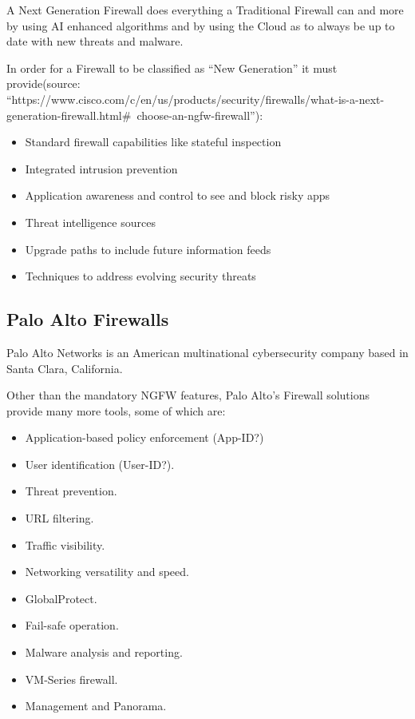 \newpage

A Next Generation Firewall does everything a Traditional Firewall can and more by using AI enhanced algorithms  and by using the Cloud as to always be up to date with new threats and malware.

In order for a Firewall to be classified as ``New Generation'' it must provide(source: ``https://www.cisco.com/c/en/us/products/security/firewalls/what-is-a-next-generation-firewall.html\#~choose-an-ngfw-firewall''):

\begin{itemize}
 \item Standard firewall capabilities like stateful inspection
 \item Integrated intrusion prevention
 \item Application awareness and control to see and block risky apps
 \item Threat intelligence sources
 \item Upgrade paths to include future information feeds
 \item Techniques to address evolving security threats
\end{itemize}

\newpage

\subsection{Palo Alto Firewalls}

Palo Alto Networks is an American multinational cybersecurity company based in Santa Clara, California.

Other than the mandatory NGFW features, Palo Alto's Firewall solutions provide many more tools, some of which are\cite{panos-features}:

\begin{itemize}
    \item Application-based policy enforcement (App-ID?)
    \item User identification (User-ID?).
    \item Threat prevention.
    \item URL filtering.
    \item Traffic visibility.
    \item Networking versatility and speed.
    \item GlobalProtect.
    \item Fail-safe operation.
    \item Malware analysis and reporting.
    \item VM-Series firewall.
    \item Management and Panorama.
\end{itemize}

